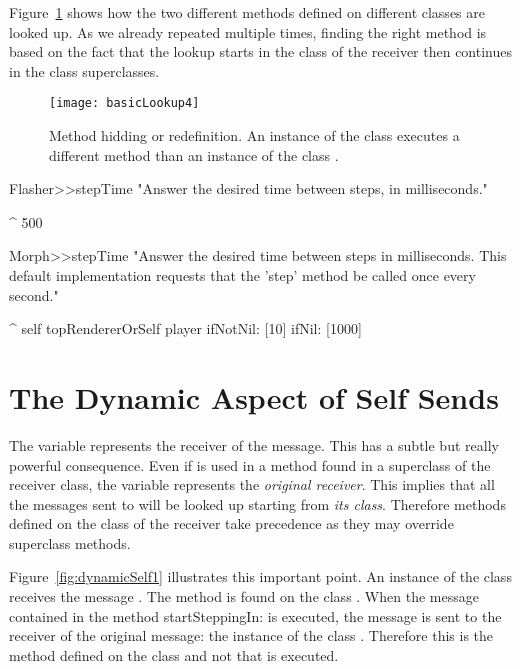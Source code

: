 Figure~\ref{fig:basicLookup4} shows how the two different  methods defined on different classes are looked up.  As we already repeated multiple times, finding the right method is based on the fact that the lookup starts in the class of the receiver then continues in the class superclasses.

\begin{figure}
\centerline{\texttt{[image: basicLookup4]}} 
\caption{Method hidding or redefinition. An instance of the class  executes a different method  than an instance of the class .\label{fig:basicLookup4}}
\end{figure}

\begin{method}\label{mth:FlasherHerestepTime}
Flasher>>stepTime
   "Answer the desired time between steps, in milliseconds."

   ^ 500
\end{method}

\begin{method}\label{mth:MorphstepTime}
Morph>>stepTime
   "Answer the desired time between steps in milliseconds. This 
   default implementation requests that the 'step' method be 
   called once every second."

   ^ self topRendererOrSelf player ifNotNil: [10] ifNil: [1000]
\end{method}


\section{The Dynamic Aspect of Self Sends}

The variable  represents the receiver of the message. This has a subtle but really powerful consequence. Even if  is used in a method found in a superclass of the receiver class, the variable  represents the \emph{original receiver}. This implies that all the messages sent to  will be looked up starting from \emph{its class}. Therefore methods defined on the class of the receiver take precedence as they may override superclass methods. 

Figure~\ref{fig:dynamicSelf1} illustrates this important point. An instance of the class  receives the message . The method  is found on the class . When the message  contained in the method startSteppingIn: is executed, the message  is sent to the receiver of the original message: the instance of the class . Therefore this is the method  defined on the class  and not  that is executed. 

